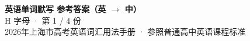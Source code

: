 \documentclass[10pt,a4paper]{article}
\begin{document}
\pagestyle{plain}

\begin{center}
{\LARGE\bfseries 英语单词默写 \quad 参考答案（英 $\to$ 中）}\\[0.22em]
{\large H 字母 · 第 1 / 4 份}\\[0.18em]
{\small 2026年上海市高考英语词汇用法手册 · 参照普通高中英语课程标准}
\end{center}

\vspace{0.2em}
\noindent{\color{rulegray}\rule{\textwidth}{0.8pt}}

\vspace{0.35em}

\vspace{0.25em}
\renewcommand{\arraystretch}{1.32}
\end{document}
